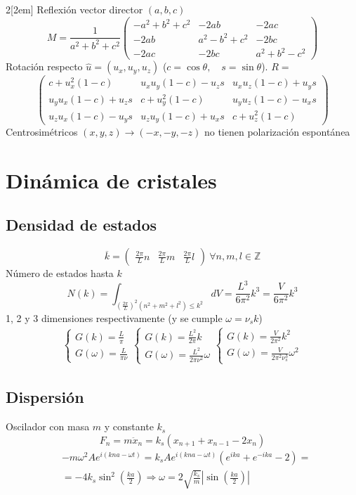 \documentclass[leqno]{article}
\begin{document}
\begin{multicols}{2}[\columnsep2em]
Reflexión vector director $(a, b, c)$
 \[
   M = \frac{1}{a^2+b^2+c^2} \begin{pmatrix} -a^2 + b^2+c^2 & -2ab & -2ac \\ -2ab & a^2-b^2+c^2 & -2bc \\ -2ac & -2bc & a^2+b^2-c^2 \end{pmatrix} 
\] 
Rotación respecto $\hat{u}=(u_x, u_y, u_z)$ ($c=\cos\theta , \quad s=\sin \theta $). $R = $
\[
\begin{pmatrix} c+u_x^2(1-c) & u_xu_y(1-c)-u_zs & u_xu_z(1-c)+u_ys \\
	u_yu_x(1-c)+u_zs & c+u_y^2(1-c) & u_yu_z(1-c)-u_xs\\
	u_zu_x(1-c)-u_ys & u_zu_y(1-c) + u_xs & c + u_z^2(1-c)
  \end{pmatrix} 
\] 
Centrosimétricos $(x, y, z)\to (-x, -y, -z)$ no tienen polarización espontánea

\section{Dinámica de cristales}
\subsection{Densidad de estados}
\[
  \overline{k} = \begin{pmatrix} \frac{2\pi}{L}n & \frac{2\pi}{L}m & \frac{2\pi}{L}l \end{pmatrix} \ \forall n, m, l \in \mathbb{Z}
\] 
Número de estados hasta $k$
 \[
N(k) = \int_{(\frac{2\pi}{L})^2(n^2 + m^2+l^2)\le k^2} dV =\frac{L^3}{6\pi^2}k^3 = \frac{V}{6\pi^2}k^3
\] 
1, 2 y 3 dimensiones respectivamente (y se cumple $\omega = \nu_s k$)
\begin{align*}
  \begin{cases}
    G(k) = \frac{L}{\pi} \\  G(\omega ) = \frac{L}{\pi \nu} 
  \end{cases}
  \begin{cases}
    G(k) = \frac{L^2}{2\pi}k \\  G(\omega ) = \frac{L^2}{2\pi \nu^2}\omega 
  \end{cases}
  \begin{cases}
    G(k) = \frac{V}{2\pi^2}k^2 \\  G(\omega ) = \frac{V}{2\pi^2 \nu_s^3}\omega ^2
  \end{cases}
\end{align*}

\subsection{Dispersión}
Oscilador con masa $m$ y constante $k_s$
\[
F_n =m\ddot{x}_n = k_s(x_{n+1}+x_{n-1}-2x_n)
\]
\begin{align*}
   &-m\omega ^2 Ae^{i(kna-\omega t)} = k_sAe^{i(kna-\omega t)}(e^{ika}+e^{-ika}-2) =\\
   &=-4k_s \sin^2\left( \frac{ka}{2} \right)  \Rightarrow \boxed{\omega = 2 \sqrt{\frac{k_s}{m}}\left|\sin \left( \frac{ka}{2} \right) \right| }
\end{align*}


\end{multicols}
\end{document}
